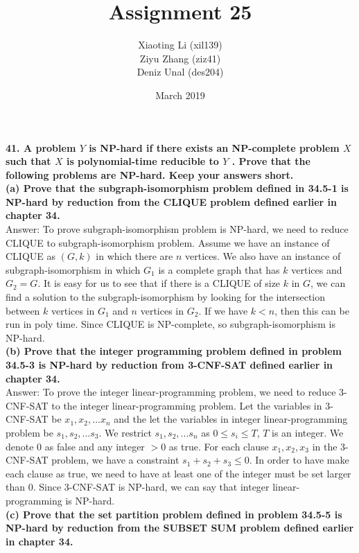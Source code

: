 \documentclass{article}
\title{Assignment 25}
\author{Xiaoting Li (xil139) \\
Ziyu Zhang (ziz41) \\
Deniz Unal (des204)}
\date{March 2019}
\begin{document}
\maketitle

\noindent
\textbf{41. A problem $Y$ is NP-hard if there exists an NP-complete problem $X$ such that $X$ is polynomial-time reducible to $Y$ . Prove that the following problems are NP-hard. Keep your answers short.}\\ \newline
\textbf{(a) Prove that the subgraph-isomorphism problem defined in 34.5-1 is NP-hard by reduction from the CLIQUE problem defined earlier in chapter 34.}\\ \newline
Answer: To prove subgraph-isomorphism problem is NP-hard, we need to reduce CLIQUE to subgraph-isomorphism problem. Assume we have an instance of CLIQUE as $(G, k)$ in which there are $n$ vertices. We also have an instance of subgraph-isomorphism in which $G_1$ is a complete graph that has $k$ vertices and $G_2 = G$. It is easy for us to see that if there is a CLIQUE of size $k$ in $G$, we can find a solution to the subgraph-isomorphism by looking for the intersection between $k$ vertices in $G_1$ and $n$ vertices in $G_2$. If we have $k < n$, then this can be run in poly time. Since CLIQUE is NP-complete, so subgraph-isomorphism is NP-hard.\\ \newline
\textbf{(b) Prove that the integer programming problem defined in problem 34.5-3 is NP-hard by reduction from 3-CNF-SAT defined earlier in chapter 34.}\\ \newline
Answer: To prove the integer linear-programming problem, we need to reduce 3-CNF-SAT to the integer linear-programming problem. Let the variables in 3-CNF-SAT be $x_1, x_2, ... x_n$ and the let the variables in integer linear-programming problem be $s_1, s_2, ... s_3$. We restrict $s_1, s_2, ... s_n$ as $0 \leq s_i \leq T$, $T$ is an integer. We denote $0$ as false and any integer $> 0$ as true. For each clause ${x_1, x_2, x_3}$ in the 3-CNF-SAT problem, we have a constraint $s_1 + s_2 + s_3 \leq 0$. In order to have make each clause as true, we need to have at least one of the integer must be set larger than 0. Since 3-CNF-SAT is NP-hard, we can say that integer linear-programming is NP-hard. \\ \newline
\textbf{(c) Prove that the set partition problem defined in problem 34.5-5 is NP-hard by reduction from the SUBSET SUM problem defined earlier in chapter 34.} \\ \newline
\end{document}
